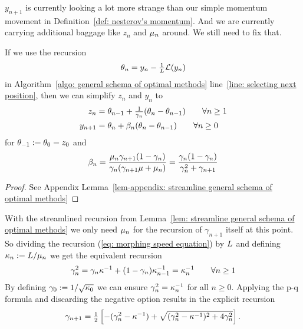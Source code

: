 \(y_{n+1}\) is currently looking a lot more strange than our simple momentum
movement in Definition~\ref{def: nesterov's momentum}. And we are currently
carrying additional baggage like \(z_n\) and \(\mu_n\) around. We still need
to fix that.

\begin{lemma}\label{lem: streamline general schema of optimal methods}
	If we use the recursion
	\begin{align}\label{eq-lem-assmpt: weigth recursion}
		\theta_n = y_n - \tfrac1{L}\mathcal{L}(y_n)
	\end{align}
	in Algorithm~\ref{algo: general schema of optimal methods} line~\ref{line:
	selecting next position}, then we can simplify \(z_n\) and \(y_n\)
	to
	\begin{align}
		z_n
		&= \theta_{n-1} + \tfrac1{\gamma_n}(\theta_n-\theta_{n-1})
		\qquad \forall n\ge 1\\
		y_{n+1}
		&=\theta_n + \beta_n(\theta_n-\theta_{n-1}) \qquad \forall n\ge 0
	\end{align}
	for \(\theta_{-1}:=\theta_0=z_0\) and
	\begin{align}
		\beta_n
		= \frac{\mu_n \gamma_{n+1}(1-\gamma_n)}{\gamma_n(\gamma_{n+1}\mu +\mu_n)}
		= \frac{\gamma_n(1-\gamma_n)}{\gamma_n^2 + \gamma_{n+1}}
	\end{align}
\end{lemma}
\begin{proof}
	See Appendix Lemma~\ref{lem-appendix: streamline general schema of optimal methods}
\end{proof}

With the streamlined recursion from Lemma~\ref{lem: streamline general schema of optimal methods}
we only need \(\mu_n\) for the recursion of \(\gamma_{n+1}\) itself at this
point. So dividing the recursion (\ref{eq: morphing speed equation}) by
\(L\) and defining \(\kappa_n:=L/\mu_n\) we get the equivalent
recursion
\begin{align}\label{eq: morphing speed recursion using condition}
	\gamma_n^2
	= \gamma_n \kappa^{-1} + (1-\gamma_n)\kappa_{n-1}^{-1}
	= \kappa^{-1}_n \qquad \forall n\ge 1
\end{align}
By defining \(\gamma_0:=1/\sqrt{\kappa_0}\) we can ensure
\(\gamma_n^2 = \kappa_n^{-1}\) for all \(n\ge0\). Applying the p-q formula
and discarding the negative option results in the explicit recursion
\begin{align*}
	\gamma_{n+1}
	= \tfrac12 \left[
		-(\gamma_n^2 - \kappa^{-1})
		+ \sqrt{(\gamma_n^2 - \kappa^{-1})^2 + 4 \gamma_n^2}
	\right].
\end{align*}

